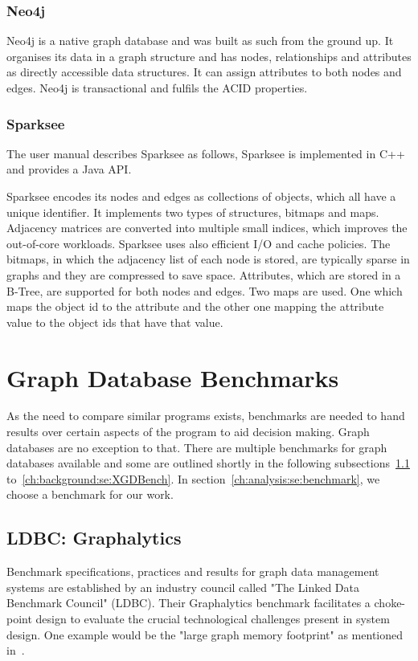 \subsubsection{Neo4j}
Neo4j is a native graph database and was built as such from the ground up.
It organises its data in a graph structure and has nodes, relationships and attributes as directly accessible data structures.
It can assign attributes to both nodes and edges.
Neo4j is transactional and fulfils the ACID properties.~\cite{Neo4jInc.2006}

\subsubsection{Sparksee}
The user manual describes Sparksee as follows, 
Sparksee is implemented in C++ and provides a Java API.

Sparksee encodes its nodes and edges as collections of objects, which all have a unique identifier.
It implements two types of structures, bitmaps and maps.
Adjacency matrices are converted into multiple small indices,
which improves the out-of-core workloads.
Sparksee uses also efficient I/O and cache policies.
The bitmaps,
in which the adjacency list of each node is stored,
are typically sparse in graphs and they are compressed to save space.
Attributes,
which are stored in a B-Tree,
are supported for both nodes and edges.
Two maps are used.
One which maps the object id to the attribute and the other one mapping the attribute value to the object ids that have that value.~\cite{TaoShen}

\section{Graph Database Benchmarks}
\label{ch:background:se:graphDatabaseBenchmarks}
As the need to compare similar programs exists,
benchmarks are needed to hand results over certain aspects of the program to aid decision making.
Graph databases are no exception to that.
There are multiple benchmarks for graph databases available and some are outlined shortly in the following subsections~\ref{ch:background:se:ldbcGraphalytics} to~\ref{ch:background:se:XGDBench}.
In section~\ref{ch:analysis:se:benchmark},
we choose a benchmark for our work.

\subsection{LDBC: Graphalytics}
\label{ch:background:se:ldbcGraphalytics}
Benchmark specifications, practices and results for graph data management systems are established by an industry council called "The Linked Data Benchmark Council" (LDBC).
Their Graphalytics benchmark facilitates a choke-point design to evaluate the crucial technological challenges present in system design.
One example would be the "large graph memory footprint" as mentioned in~\cite[2]{Capota2015}.

